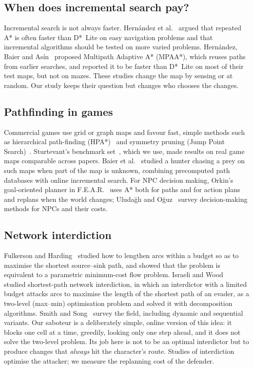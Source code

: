 \documentclass[conference,12pt]{IEEEtran}
\newcommand{\dstar}{D*~Lite}
\begin{document}
\subsection{When does incremental search pay?}
Incremental search is not always faster. Hern{\'a}ndez et al.~\cite{hernandez2012poorly}
argued that repeated A* is often faster than \dstar{} on easy navigation problems and that
incremental algorithms should be tested on more varied problems. Hern{\'a}ndez, Baier and
As{\'i}n~\cite{hernandez2014mpaa} proposed Multipath Adaptive A* (MPAA*), which reuses paths
from earlier searches, and reported it to be faster than \dstar{} on most of their test maps,
but not on mazes. These studies change the map by sensing or at random. Our study keeps their
question but changes who chooses the changes.

\subsection{Pathfinding in games}
Commercial games use grid or graph maps and favour fast, simple methods such as hierarchical
path-finding (HPA*)~\cite{botea2004hpa} and symmetry pruning (Jump Point
Search)~\cite{harabor2011jps}. Sturtevant's benchmark set~\cite{sturtevant2012benchmarks},
which we use, made results on real game maps comparable across papers. Baier et
al.~\cite{baier2015prey} studied a hunter chasing a prey on such maps when part of the map is
unknown, combining precomputed path databases with online incremental search. For NPC decision
making, Orkin's goal-oriented planner in F.E.A.R.~\cite{orkin2006fear} uses A* both for paths
and for action plans and replans when the world changes; Uluda{\u{g}}l{\i} and
O{\u{g}}uz~\cite{uludagli2023npc} survey decision-making methods for NPCs and their costs.

\subsection{Network interdiction}
Fulkerson and Harding~\cite{fulkerson1977maximizing} studied how to lengthen arcs within a
budget so as to maximise the shortest source--sink path, and showed that the problem is
equivalent to a parametric minimum-cost flow problem. Israeli and
Wood~\cite{israeli2002interdiction} studied shortest-path network interdiction, in which an
interdictor with a limited budget attacks arcs to maximise the length of the shortest path of
an evader, as a two-level (max--min) optimisation problem
and solved it with decomposition algorithms. Smith and Song~\cite{smith2020interdiction} survey
the field, including dynamic and sequential variants. Our saboteur is a deliberately simple,
online version of this idea: it blocks one cell at a time, greedily, looking only one step
ahead, and it does not solve the two-level problem. Its job here is not to be an optimal
interdictor but to produce changes that \emph{always} hit the character's route. Studies of
interdiction optimise the attacker; we measure the replanning cost of the defender.
\end{document}
